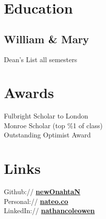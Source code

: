 \documentclass[letterpaper]{deedy-resume} %
\begin{document}
\begin{minipage}[t]{0.33\textwidth} %


\section{Education} 

\subsection{William \& Mary}


\sectionspace %

Dean's List all semesters \\

\sectionspace %


\section{Awards} 

Fulbright Scholar to London \\
Monroe Scholar (top \%1 of class) \\
Outstanding Optimist Award

\sectionspace %


\section{Links} 

Github:// \href{https://github.com/newOnahtaN}{\bf newOnahtaN} \\
Personal:// \href{http://nateo.co}{\bf nateo.co} \\
LinkedIn:// \href{https://www.linkedin.com/in/nathancoleowen}{\bf nathancoleowen} \\


\end{minipage}
\end{document}
